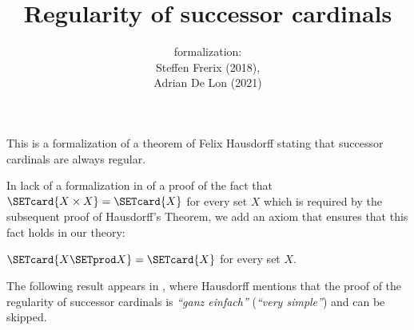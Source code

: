 \documentclass{article}
\title{Regularity of successor cardinals}
\author{\Naproche formalization:\\[0.5em]
Steffen Frerix (2018), \\
Adrian De Lon (2021)}
\date{}
\begin{document}
  \maketitle


  \noindent This is a formalization of a theorem of Felix Hausdorff stating that
  successor cardinals are always regular.

  In lack of a formalization in \Naproche of a proof of the fact that
  $\SETcard{X \times X} = \SETcard{X}$ for every set $X$ which is required by the subsequent
  proof of Hausdorff's Theorem, we add an axiom that ensures that this fact
  holds in our theory:

  \begin{forthel}
    \begin{axiom*}
      $\SETcard{X \SETprod X} = \SETcard{X}$ for every set $X$.
    \end{axiom*}
  \end{forthel}

  The following result appears in \cite[p.~443]{Hausdorff1908},
  where Hausdorff mentions that the proof of the regularity of successor
  cardinals is \textit{``ganz einfach''} (\textit{``very simple''})
  and can be skipped.
\end{document}
